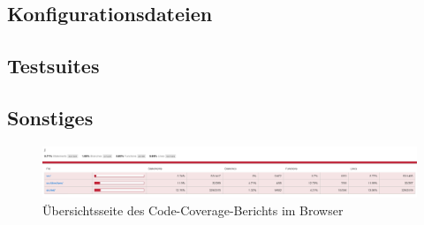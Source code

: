 \subsection{Konfigurationsdateien}

	

	\newpage
	

	\newpage
	

\newpage
\subsection{Testsuites}
	
	
	\newpage
	

	\newpage
	

	\newpage
	

	\newpage
	

	\newpage
	

	\newpage
	

\newpage
\subsection{Sonstiges}
\begin{figure}[H]
	\includegraphics[width=\textwidth]{abb/code-cov-1.png}
	\caption{Übersichtsseite des Code-Coverage-Berichts im Browser}
	\label{abb:code-cov-1}
\end{figure}

